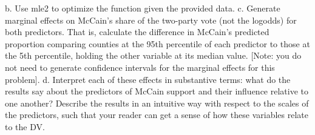 \documentclass{article}\usepackage[]{graphicx}\usepackage[]{color}
\begin{document}
b. Use mle2 to optimize the function given the provided data.
c. Generate marginal effects on McCain’s share of the two-party vote (not the logodds) for both predictors. That is, calculate the difference in McCain’s predicted proportion comparing counties at the 95th percentile of each predictor to those at the 5th percentile, holding the other variable at its median value. [Note: you do not need to generate confidence intervals for the marginal effects for this problem].
d. Interpret each of these effects in substantive terms: what do the results say about the predictors of McCain support and their influence relative to one another? Describe the results in an intuitive way with respect to the scales of the predictors, such that your reader can get a sense of how these variables relate to the DV.
\end{document}
